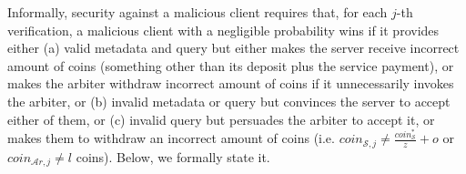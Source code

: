  
 
 
 
Informally, security against a malicious client requires that, for each  $j$-th verification, a malicious client with a negligible probability  wins if it provides either (a) valid metadata and query but either makes the server receive incorrect amount of coins (something other than its deposit plus the service payment), or makes the arbiter withdraw incorrect amount of coins if it unnecessarily invokes the arbiter,  or (b) invalid metadata or query but convinces the server to accept either of them, or (c) invalid query but persuades the arbiter to accept it, or  makes them to withdraw an incorrect amount of coins (i.e. $coin_{\scriptscriptstyle\mathcal{S},j}\neq \frac{coin_{\scriptscriptstyle\mathcal S}^{\scriptscriptstyle*}}{z}+o$ or  $coin_{\scriptscriptstyle\mathcal{A}r,j}\neq l$ coins). Below, we formally state it. 
 
 
 
